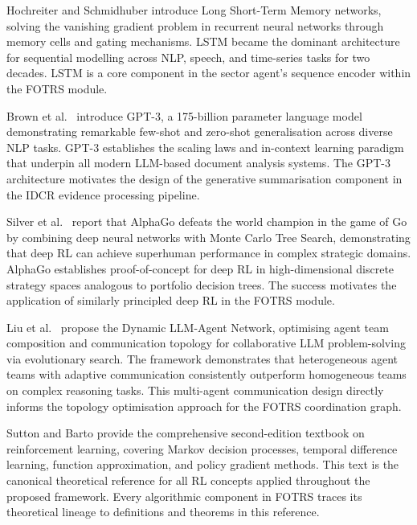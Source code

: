 \documentclass[12pt,a4paper,oneside]{report}
\theoremstyle{definition}
\theoremstyle{remark}
\begin{document}
\medskip

\noindent Hochreiter and Schmidhuber \cite{Hochreiter1997LSTM} introduce Long Short-Term Memory networks, solving the vanishing gradient problem in recurrent neural networks through memory cells and gating mechanisms. LSTM became the dominant architecture for sequential modelling across NLP, speech, and time-series tasks for two decades. LSTM is a core component in the sector agent's sequence encoder within the FOTRS module.

\medskip

\noindent Brown et al.\ \cite{Brown2020GPT3} introduce GPT-3, a 175-billion parameter language model demonstrating remarkable few-shot and zero-shot generalisation across diverse NLP tasks. GPT-3 establishes the scaling laws and in-context learning paradigm that underpin all modern LLM-based document analysis systems. The GPT-3 architecture motivates the design of the generative summarisation component in the IDCR evidence processing pipeline.

\medskip

\noindent Silver et al.\ \cite{Silver2016AlphaGo} report that AlphaGo defeats the world champion in the game of Go by combining deep neural networks with Monte Carlo Tree Search, demonstrating that deep RL can achieve superhuman performance in complex strategic domains. AlphaGo establishes proof-of-concept for deep RL in high-dimensional discrete strategy spaces analogous to portfolio decision trees. The success motivates the application of similarly principled deep RL in the FOTRS module.

\medskip

\noindent Liu et al.\ \cite{Liu2023LLMAgents} propose the Dynamic LLM-Agent Network, optimising agent team composition and communication topology for collaborative LLM problem-solving via evolutionary search. The framework demonstrates that heterogeneous agent teams with adaptive communication consistently outperform homogeneous teams on complex reasoning tasks. This multi-agent communication design directly informs the topology optimisation approach for the FOTRS coordination graph.

\medskip

\noindent Sutton and Barto \cite{Sutton2018RL} provide the comprehensive second-edition textbook on reinforcement learning, covering Markov decision processes, temporal difference learning, function approximation, and policy gradient methods. This text is the canonical theoretical reference for all RL concepts applied throughout the proposed framework. Every algorithmic component in FOTRS traces its theoretical lineage to definitions and theorems in this reference.
\end{document}

